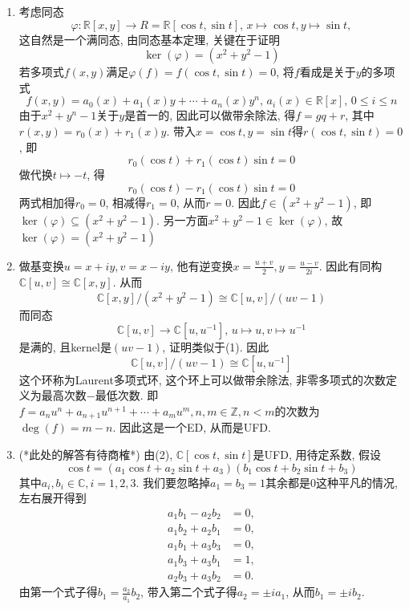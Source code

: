\begin{solution}
\begin{enumerate}[(1)]
    \item 考虑同态
    \[
        \varphi: \mathbb{R}[x, y] \to R = \mathbb{R}[\cos t, \sin t],\, x \mapsto \cos t, y \mapsto \sin t,
    \]
    这自然是一个满同态, 由同态基本定理, 关键在于证明
    \[
        \ker(\varphi) = (x^2 + y^2 - 1)
    \]
    若多项式$f(x, y)$满足$\varphi(f) = f(\cos t, \sin t) = 0$, 将$f$看成是关于$y$的多项式
    \[
        f(x, y) = a_0(x) + a_1(x)y + \cdots + a_n(x)y^n,\, a_i(x) \in \mathbb{R}[x],\, 0 \leqslant i \leqslant n
    \]
    由于$x^2 + y^n - 1$关于$y$是首一的, 因此可以做带余除法, 得$f = gq + r$, 其中$r(x, y) = r_0(x) + r_1(x)y$. 带入$x = \cos t, y = \sin t$得$r(\cos t, \sin t) = 0$, 即
    \[
        r_0(\cos t) + r_1(\cos t)\sin t = 0
    \]
    做代换$t \mapsto -t$, 得
    \[
        r_0(\cos t) - r_1(\cos t)\sin t = 0
    \]
    两式相加得$r_0 = 0$, 相减得$r_1 = 0$, 从而$r = 0$. 因此$f \in (x^2 + y^2 - 1)$, 即$\ker(\varphi) \subseteq (x^2 + y^2 - 1)$. 另一方面$x^2 + y^2 - 1 \in \ker(\varphi)$, 故$\ker(\varphi) = (x^2 + y^2 - 1)$
    \item 做基变换$u = x + iy, v = x - iy$, 他有逆变换$x = \frac{u + v}{2}, y = \frac{u - v}{2i}$. 因此有同构$\mathbb{C}[u, v] \cong \mathbb{C}[x, y]$. 从而
    \[
        \mathbb{C}[x, y]/(x^2 + y^2 - 1) \cong \mathbb{C}[u, v]/(uv - 1)
    \]
    而同态
    \[
        \mathbb{C}[u, v] \to \mathbb{C}[u, u^{-1}],\, u \mapsto u, v \mapsto u^{-1}
    \]
    是满的, 且kernel是$(uv - 1)$, 证明类似于(1). 因此
    \[
        \mathbb{C}[u, v]/(uv - 1) \cong \mathbb{C}[u, u^{-1}]
    \]
    这个环称为Laurent多项式环, 这个环上可以做带余除法, 非零多项式的次数定义为最高次数$-$最低次数. 即$f = a_nu^n + a_{n + 1}u^{n + 1} + \cdots + a_mu^m, n, m \in \mathbb{Z}, n < m$的次数为$\deg(f) = m - n$.
    因此这是一个ED, 从而是UFD.
    \item (*此处的解答有待商榷*) 由(2), $\mathbb{C}[\cos t, \sin t]$是UFD, 用待定系数, 假设
    \[
        \cos t = (a_1\cos t + a_2\sin t + a_3)(b_1\cos t + b_2\sin t + b_3)
    \]
    其中$a_i, b_i \in \mathbb{C}, i = 1, 2, 3$. 我们要忽略掉$a_1 = b_3 = 1$其余都是$0$这种平凡的情况, 左右展开得到
    \[
        \begin{aligned}
            a_1b_1 - a_2b_2 &= 0,\\
            a_1b_2 + a_2b_1 &= 0,\\
            a_1b_1 + a_3b_3 &= 0,\\
            a_1b_3 + a_3b_1 &= 1,\\
            a_2b_3 + a_3b_2 &= 0.
        \end{aligned}
    \]
    由第一个式子得$b_1 = \frac{a_2}{a_1}b_2$, 带入第二个式子得$a_2 = \pm ia_1$, 从而$b_1 = \pm ib_2$.
    

\end{enumerate}
\end{solution}
